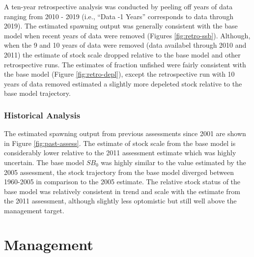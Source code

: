 \documentclass[11pt,
  english,
  a4paper,
]{article}
\begin{document}
A ten-year retrospective analysis was conducted by peeling off years of data ranging from 2010 - 2019 (i.e., ``Data -1 Years'' corresponds to data through 2019). The estimated spawning output was generally consistent with the base model when recent years of data were removed (Figures \ref{fig:retro-ssb}). Although, when the 9 and 10 years of data were removed (data availabel through 2010 and 2011) the estimate of stock scale dropped relative to the base model and other retrospective runs. The estimates of fraction unfished were fairly consistent with the base model (Figure \ref{fig:retro-depl}), except the retrospective run with 10 years of data removed estimated a slightly more depeleted stock relative to the base model trajectory.

\leavevmode\tagmcend\tagstructend\par


\hypertarget{historical-analysis}{%
\subsubsection{Historical Analysis}\label{historical-analysis}}

\leavevmode\tagmcend\tagstructend


The estimated spawning output from previous assessments since 2001 are shown in Figure \ref{fig:past-assess}. The estimate of stock scale from the base model is considerably lower relative to the 2011 assessment estimate which was highly uncertain. The base model {\(SB_0\)\leavevmode\tagmcend\tagstructend} was highly similar to the value estimated by the 2005 assessment, the stock trajectory from the base model diverged between 1960-2005 in comparison to the 2005 estimate. The relative stock status of the base model was relatively consistent in trend and scale with the estimate from the 2011 assessment, although slightly less optomistic but still well above the management target.

\leavevmode\tagmcend\tagstructend\par


\hypertarget{management}{%
\section{Management}\label{management}}
\end{document}
